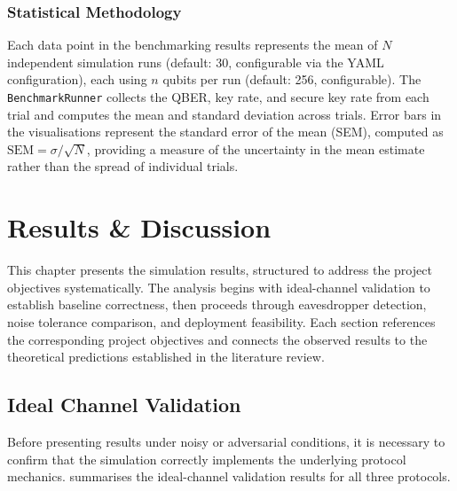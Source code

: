 \documentclass[10pt, a4paper]{report}
\begin{document}
\subsection{Statistical Methodology}

Each data point in the benchmarking results represents the mean of $N$ independent simulation runs (default: 30, configurable via the YAML configuration), each using $n$ qubits per run (default: 256, configurable). The \texttt{BenchmarkRunner} collects the QBER, key rate, and secure key rate from each trial and computes the mean and standard deviation across trials. Error bars in the visualisations represent the standard error of the mean (SEM), computed as $\text{SEM} = \sigma / \sqrt{N}$, providing a measure of the uncertainty in the mean estimate rather than the spread of individual trials.



\chapter{Results \& Discussion}

This chapter presents the simulation results, structured to address the project objectives systematically. The analysis begins with ideal-channel validation to establish baseline correctness, then proceeds through eavesdropper detection, noise tolerance comparison, and deployment feasibility. Each section references the corresponding project objectives and connects the observed results to the theoretical predictions established in the literature review.


\section{Ideal Channel Validation}

Before presenting results under noisy or adversarial conditions, it is necessary to confirm that the simulation correctly implements the underlying protocol mechanics.  summarises the ideal-channel validation results for all three protocols.
\end{document}
